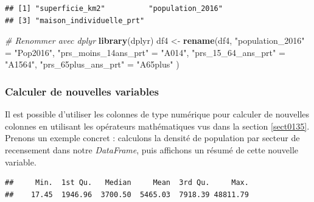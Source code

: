 \documentclass[
  11pt,
  french,
]{book}
\makeatletter
\newenvironment{Shaded}{\begin{snugshade}}{\end{snugshade}}
\newcommand{\CommentTok}[1]{\textcolor[rgb]{0.56,0.35,0.01}{\textit{#1}}}
\newcommand{\DecValTok}[1]{\textcolor[rgb]{0.00,0.00,0.81}{#1}}
\newcommand{\KeywordTok}[1]{\textcolor[rgb]{0.13,0.29,0.53}{\textbf{#1}}}
\newcommand{\NormalTok}[1]{#1}
\newcommand{\OperatorTok}[1]{\textcolor[rgb]{0.81,0.36,0.00}{\textbf{#1}}}
\newcommand{\StringTok}[1]{\textcolor[rgb]{0.31,0.60,0.02}{#1}}
\newenvironment{kframe}{%
\medskip{}
\setlength{\fboxsep}{.8em}
 \def\at@end@of@kframe{}%
 \ifinner\ifhmode%
  \def\at@end@of@kframe{\end{minipage}}%
  \begin{minipage}{\columnwidth}%
 \fi\fi%
 \def\FrameCommand##1{\hskip\@totalleftmargin \hskip-\fboxsep
 \colorbox{shadecolor}{##1}\hskip-\fboxsep
     \hskip-\linewidth \hskip-\@totalleftmargin \hskip\columnwidth}%
 \MakeFramed {\advance\hsize-\width
   \@totalleftmargin\z@ \linewidth\hsize
   \@setminipage}}%
 {\par\unskip\endMakeFramed%
 \at@end@of@kframe}
\renewenvironment{Shaded}{\begin{kframe}}{\end{kframe}}
\makeatother
\begin{document}
\begin{verbatim}
## [1] "superficie_km2"          "population_2016"        
## [3] "maison_individuelle_prt"
\end{verbatim}

\begin{Shaded}
\begin{Highlighting}[]
\CommentTok{# Renommer avec dplyr}
\KeywordTok{library}\NormalTok{(dplyr)}
\NormalTok{df4 <-}\StringTok{ }\KeywordTok{rename}\NormalTok{(df4, }\StringTok{"population_2016"}\NormalTok{ =}\StringTok{ "Pop2016"}\NormalTok{,}
              \StringTok{"prs_moins_14ans_prt"}\NormalTok{ =}\StringTok{ "A014"}\NormalTok{,}
              \StringTok{"prs_15_64_ans_prt"}\NormalTok{ =}\StringTok{ "A1564"}\NormalTok{,}
              \StringTok{"prs_65plus_ans_prt"}\NormalTok{ =}\StringTok{ "A65plus"}
\NormalTok{              )}
\end{Highlighting}
\end{Shaded}

\hypertarget{sect01423}{%
\subsubsection{Calculer de nouvelles variables}\label{sect01423}}

Il est possible d'utiliser les colonnes de type numérique pour calculer de nouvelles colonnes en utilisant les opérateurs mathématiques vus dans la section \ref{sect0135}. Prenons un exemple concret : calculons la densité de population par secteur de recensement dans notre \emph{DataFrame}, puis affichons un résumé de cette nouvelle variable.

\begin{Shaded}
\end{Shaded}

\begin{verbatim}
##     Min.  1st Qu.   Median     Mean  3rd Qu.     Max. 
##    17.45  1946.96  3700.50  5465.03  7918.39 48811.79
\end{verbatim}
\end{document}
